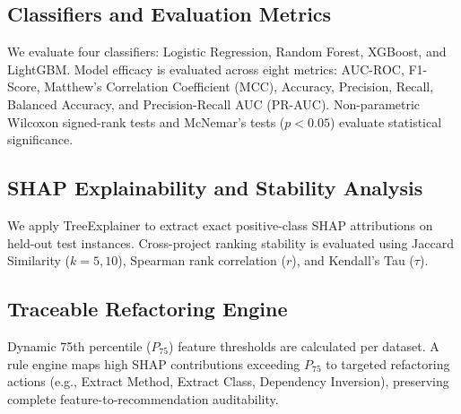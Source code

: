 \documentclass[10pt,journal,compsoc]{IEEEtran}
\begin{document}
\subsection{Classifiers and Evaluation Metrics}
We evaluate four classifiers: Logistic Regression, Random Forest, XGBoost, and LightGBM. Model efficacy is evaluated across eight metrics: AUC-ROC, F1-Score, Matthew's Correlation Coefficient (MCC), Accuracy, Precision, Recall, Balanced Accuracy, and Precision-Recall AUC (PR-AUC). Non-parametric Wilcoxon signed-rank tests and McNemar's tests ($p < 0.05$) evaluate statistical significance.

\subsection{SHAP Explainability and Stability Analysis}
We apply TreeExplainer to extract exact positive-class SHAP attributions on held-out test instances. Cross-project ranking stability is evaluated using Jaccard Similarity ($k=5, 10$), Spearman rank correlation ($r$), and Kendall's Tau ($\tau$).

\subsection{Traceable Refactoring Engine}
Dynamic 75th percentile ($P_{75}$) feature thresholds are calculated per dataset. A rule engine maps high SHAP contributions exceeding $P_{75}$ to targeted refactoring actions (e.g., Extract Method, Extract Class, Dependency Inversion), preserving complete feature-to-recommendation auditability.
\end{document}
